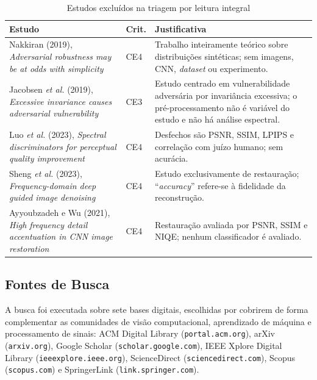 \documentclass[conference]{IEEEtran}
\begin{document}
\begin{table}[htbp]
\caption{Estudos excluídos na triagem por leitura integral}
\begin{center}
\footnotesize
\begin{tabular}{|p{3.3cm}|p{0.7cm}|p{2.9cm}|}
\hline
\textbf{Estudo} & \textbf{Crit.} & \textbf{Justificativa} \\
\hline
Nakkiran (2019), \textit{Adversarial robustness may be at odds with
simplicity} & CE4 & Trabalho inteiramente teórico sobre distribuições
sintéticas; sem imagens, CNN, \textit{dataset} ou experimento. \\
\hline
Jacobsen \textit{et al.} (2019), \textit{Excessive invariance causes
adversarial vulnerability} & CE3 & Estudo centrado em vulnerabilidade
adversária por invariância excessiva; o pré-processamento não é variável do
estudo e não há análise espectral. \\
\hline
Luo \textit{et al.} (2023), \textit{Spectral discriminators for perceptual
quality improvement} & CE4 & Desfechos são PSNR, SSIM, LPIPS e correlação com
juízo humano; sem acurácia. \\
\hline
Sheng \textit{et al.} (2023), \textit{Frequency-domain deep guided image
denoising} & CE4 & Estudo exclusivamente de restauração; ``\textit{accuracy}''
refere-se à fidelidade da reconstrução. \\
\hline
Ayyoubzadeh e Wu (2021), \textit{High frequency detail accentuation in CNN
image restoration} & CE4 & Restauração avaliada por PSNR, SSIM e NIQE; nenhum
classificador é avaliado. \\
\hline
\end{tabular}
\label{tab:excluidos}
\end{center}
\end{table}

\subsection{Fontes de Busca}
\label{sec:fb}

A busca foi executada sobre sete bases digitais, escolhidas por cobrirem de
forma complementar as comunidades de visão computacional, aprendizado de
máquina e processamento de sinais: ACM Digital Library
(\texttt{portal.acm.org}), arXiv (\texttt{arxiv.org}), Google Scholar
(\texttt{scholar.google.com}), IEEE Xplore Digital Library
(\texttt{ieeexplore.ieee.org}), ScienceDirect (\texttt{sciencedirect.com}),
Scopus (\texttt{scopus.com}) e SpringerLink (\texttt{link.springer.com}).
\end{document}
